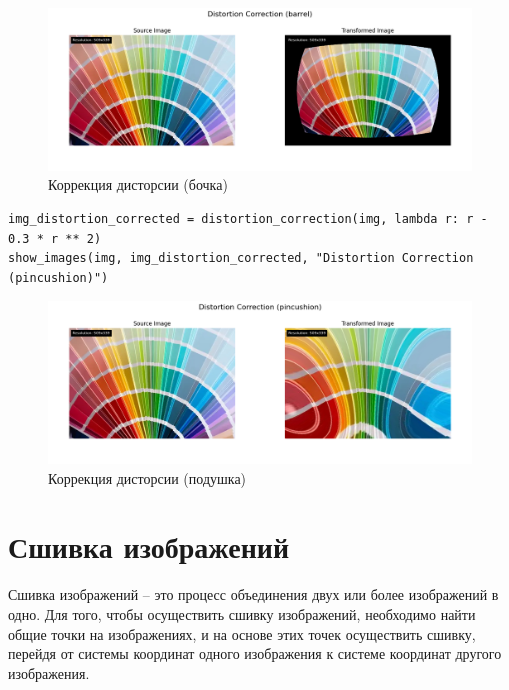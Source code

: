 \begin{figure}[ht]
    \includegraphics[width=\textwidth]{../results/Distortion Correction (barrel).png}
    \caption{Коррекция дисторсии (бочка)}
    \label{fig:distortion_correction_barrel}
\end{figure}

\begin{lstlisting}[style=python_white, caption={Исходный код для коррекции подушкообразной дисторсии}]
img_distortion_corrected = distortion_correction(img, lambda r: r - 0.3 * r ** 2)
show_images(img, img_distortion_corrected, "Distortion Correction (pincushion)")
\end{lstlisting}

\begin{figure}[ht]
    \includegraphics[width=\textwidth]{../results/Distortion Correction (pincushion).png}
    \caption{Коррекция дисторсии (подушка)}
    \label{fig:distortion_correction_pincushion}
\end{figure}

\pagebreak
\section{Сшивка изображений}

Сшивка изображений -- это процесс объединения двух или более изображений в одно.
Для того, чтобы осуществить сшивку изображений, необходимо найти общие точки на изображениях, и на основе этих точек осуществить сшивку, 
перейдя от системы координат одного изображения к системе координат другого изображения.

